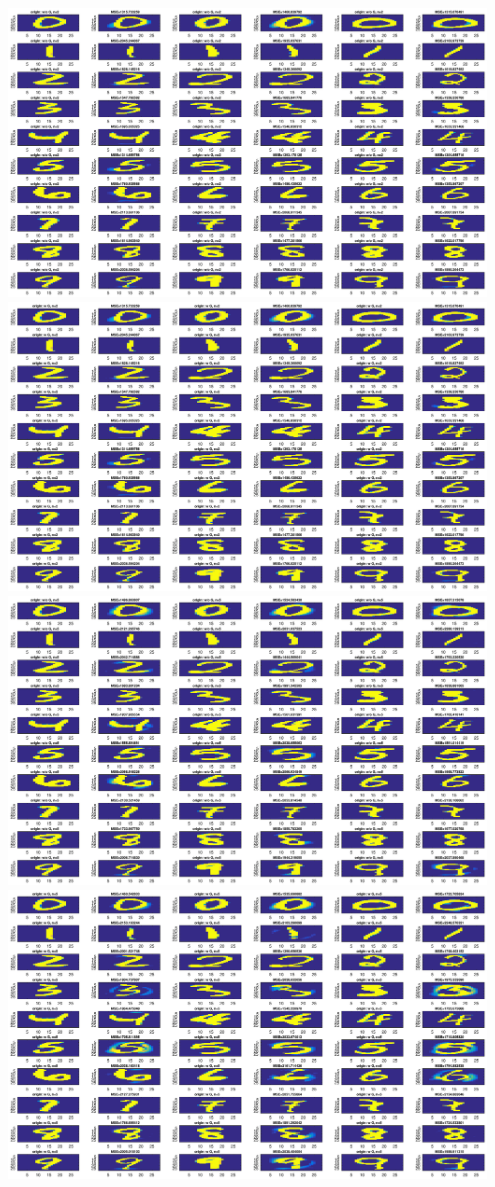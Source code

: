 \documentclass[letterpaper,10pt]{article}
\begin{document}
\begin{enumerate}
\begin{center}
	\includegraphics[width=0.95\textwidth]{./matlab/WoG_N02.eps}
	\includegraphics[width=0.95\textwidth]{./matlab/WG_N02.eps}
	\includegraphics[width=0.95\textwidth]{./matlab/WoG_N05.eps}
	\includegraphics[width=0.95\textwidth]{./matlab/WG_N05.eps}

\end{center}
\end{enumerate}
\end{document}
